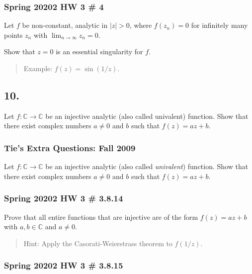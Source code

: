 \hypertarget{spring-20202-hw-3-4}{%
\subsubsection{Spring 20202 HW 3 \# 4}\label{spring-20202-hw-3-4}}

Let \(f\) be non-constant, analytic in
\({\left\lvert {z} \right\rvert} > 0\), where \(f(z_n) = 0\) for
infinitely many points \(z_n\) with \(\lim_{n\to\infty} z_n = 0\).

Show that \(z=0\) is an essential singularity for \(f\).

\begin{quote}
Example: \(f(z) = \sin(1/z)\).
\end{quote}

\hypertarget{section-6}{%
\subsection{10.}\label{section-6}}

Let \(f: {\mathbb C} \rightarrow {\mathbb C}\) be an injective analytic
(also called univalent) function. Show that there exist complex numbers
\(a \neq 0\) and \(b\) such that \(f(z) = az + b\).

\hypertarget{ties-extra-questions-fall-2009-11}{%
\subsubsection{Tie's Extra Questions: Fall
2009}\label{ties-extra-questions-fall-2009-11}}

Let \(f: {\mathbb C} \rightarrow {\mathbb C}\) be an injective analytic
(also called \emph{univalent}) function. Show that there exist complex
numbers \(a \neq 0\) and \(b\) such that \(f(z) = az + b\).

\hypertarget{spring-20202-hw-3-3.8.14}{%
\subsubsection{Spring 20202 HW 3 \#
3.8.14}\label{spring-20202-hw-3-3.8.14}}

Prove that all entire functions that are injective are of the form
\(f(z) = az + b\) with \(a,b\in {\mathbb{C}}\) and \(a\neq 0\).

\begin{quote}
Hint: Apply the Casorati-Weierstrass theorem to \(f(1/z)\).
\end{quote}

\hypertarget{spring-20202-hw-3-3.8.15}{%
\subsubsection{Spring 20202 HW 3 \#
3.8.15}\label{spring-20202-hw-3-3.8.15}}


